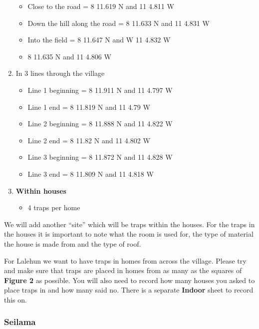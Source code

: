 \documentclass[
]{article}
\providecommand{\tightlist}{%
  \setlength{\itemsep}{0pt}\setlength{\parskip}{0pt}}
\begin{document}
\begin{enumerate}
  \begin{itemize}
  \tightlist
  \item
    Close to the road = 8 11.619 N and 11 4.811 W
  \item
    Down the hill along the road = 8 11.633 N and 11 4.831 W
  \item
    Into the field = 8 11.647 N and W 11 4.832 W
  \item
    8 11.635 N and 11 4.806 W
  \end{itemize}
\item
  In 3 lines through the village

  \begin{itemize}
  \tightlist
  \item
    Line 1 beginning = 8 11.911 N and 11 4.797 W
  \item
    Line 1 end = 8 11.819 N and 11 4.79 W
  \item
    Line 2 beginning = 8 11.888 N and 11 4.822 W
  \item
    Line 2 end = 8 11.82 N and 11 4.802 W
  \item
    Line 3 beginning = 8 11.872 N and 11 4.828 W
  \item
    Line 3 end = 8 11.809 N and 11 4.818 W
  \end{itemize}
\item
  \textbf{Within houses}

  \begin{itemize}
  \tightlist
  \item
    4 traps per home
  \end{itemize}
\end{enumerate}

We will add another ``site'' which will be traps within the houses. For
the traps in the houses it is important to note what the room is used
for, the type of material the house is made from and the type of roof.

For Lalehun we want to have traps in homes from across the village.
Please try and make sure that traps are placed in homes from as many as
the squares of \textbf{Figure 2} as possible. You will also need to
record how many houses you asked to place traps in and how many said no.
There is a separate \textbf{Indoor} sheet to record this on.

\hypertarget{seilama}{%
\subsubsection{Seilama}\label{seilama}}
\end{document}
